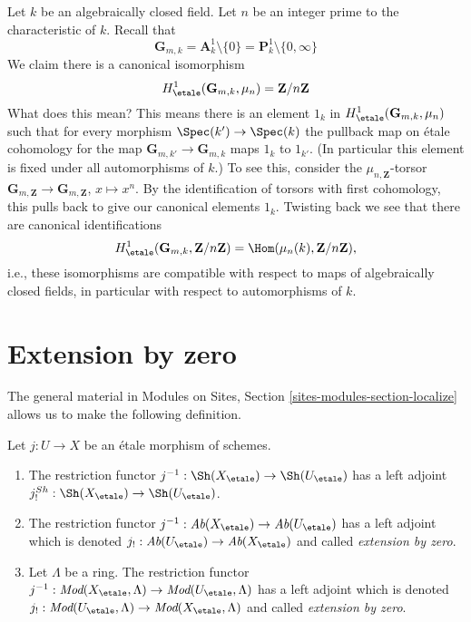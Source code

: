 \begin{remark}
\label{remark-normalize-H1-Gm}
Let $k$ be an algebraically closed field. Let $n$ be an integer prime to
the characteristic of $k$. Recall that
$$
\mathbf{G}_{m, k} = \mathbf{A}^1_k \setminus \{0\} =
\mathbf{P}^1_k \setminus \{0, \infty\}
$$
We claim there is a canonical isomorphism
$$
H^1_\etale(\mathbf{G}_{m, k}, \mu_n) = \mathbf{Z}/n\mathbf{Z}
$$
What does this mean? This means there is an element $1_k$ in
$H^1_\etale(\mathbf{G}_{m, k}, \mu_n)$ such that for
every morphism $\Spec(k') \to \Spec(k)$ the pullback map on
\'etale cohomology for the map $\mathbf{G}_{m, k'} \to \mathbf{G}_{m, k}$
maps $1_k$ to $1_{k'}$. (In particular this element is
fixed under all automorphisms of $k$.) To see this, consider the
$\mu_{n, \mathbf{Z}}$-torsor
$\mathbf{G}_{m, \mathbf{Z}} \to \mathbf{G}_{m, \mathbf{Z}}$,
$x \mapsto x^n$. By the identification of torsors with
first cohomology, this pulls back to give our canonical elements $1_k$.
Twisting back we see that there are canonical identifications
$$
H^1_\etale(\mathbf{G}_{m, k}, \mathbf{Z}/n\mathbf{Z}) =
\Hom(\mu_n(k), \mathbf{Z}/n\mathbf{Z}),
$$
i.e., these isomorphisms are compatible with respect to maps of
algebraically closed fields, in particular with respect to
automorphisms of $k$.
\end{remark}










\section{Extension by zero}
\label{section-extension-by-zero}

\noindent
The general material in
Modules on Sites, Section \ref{sites-modules-section-localize}
allows us to make the following definition.

\begin{definition}
\label{definition-extension-zero}
Let $j : U \to X$ be an \'etale morphism of schemes.
\begin{enumerate}
\item The restriction functor
$j^{-1} : \Sh(X_\etale) \to \Sh(U_\etale)$
has a left adjoint
$j_!^{Sh} : \Sh(X_\etale) \to \Sh(U_\etale)$.
\item The restriction functor
$j^{-1} : \textit{Ab}(X_\etale) \to \textit{Ab}(U_\etale)$
has a left adjoint which is denoted
$j_! : \textit{Ab}(U_\etale) \to \textit{Ab}(X_\etale)$
and called {\it extension by zero}.
\item Let $\Lambda$ be a ring. The restriction functor
$j^{-1} : \textit{Mod}(X_\etale, \Lambda) \to
\textit{Mod}(U_\etale, \Lambda)$
has a left adjoint which is denoted
$j_! : \textit{Mod}(U_\etale, \Lambda) \to
\textit{Mod}(X_\etale, \Lambda)$
and called {\it extension by zero}.
\end{enumerate}
\end{definition}

